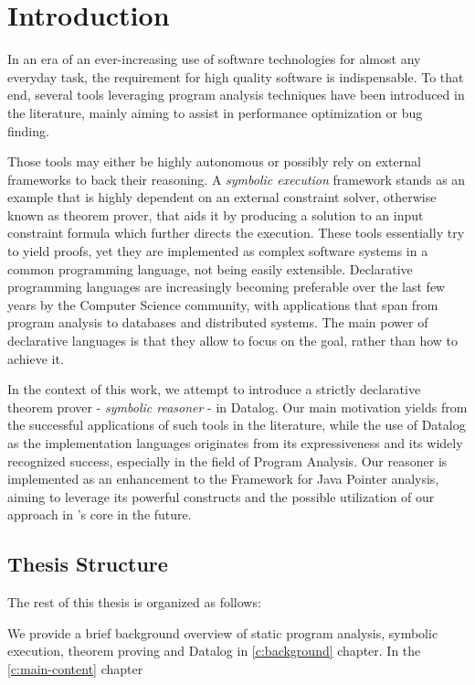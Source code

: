 
\chapter{Introduction}\label{c:introduction}

In an era of an ever-increasing use of software technologies
for almost any everyday task, the requirement for high quality software is indispensable. To
 that end, several tools leveraging program analysis techniques have been
introduced in the literature, mainly aiming to assist in performance optimization or bug finding.

Those tools may either be highly autonomous or possibly rely on external frameworks to back their reasoning.
A \emph{symbolic execution} framework stands as an example that is highly dependent on an
external constraint solver, otherwise known as theorem prover, that aids it by producing a solution to an input
constraint formula which further directs the execution. These tools essentially try to yield proofs, yet they
are implemented as complex software systems in a common programming language, not being easily extensible.
Declarative programming languages are increasingly becoming preferable over the last few years by
the Computer Science community, with applications that span from program analysis to databases and distributed
systems. The main power of declarative languages is that they allow to focus on the goal, rather than
how to achieve it.

In the context of this work, we attempt to introduce a strictly declarative theorem prover - \emph{symbolic reasoner} -
in Datalog. Our main motivation yields from the successful applications of such tools in the literature, while
the use of Datalog as the implementation languages originates from its expressiveness and its widely recognized
success, especially in the field of Program Analysis. Our reasoner is implemented as an enhancement to the
\doop{} Framework for Java Pointer analysis, aiming to leverage its powerful constructs and the possible
utilization of our approach in \doop{}'s core in the future.

\section{Thesis Structure}\label{s:structure}

The rest of this thesis is organized as follows:

We provide a brief background overview of static program analysis, symbolic execution,
theorem proving and Datalog in \ref{c:background} chapter. In the \ref{c:main-content}
chapter

